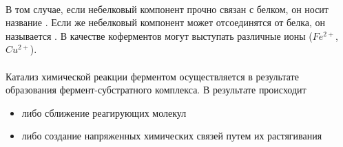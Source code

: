 \paragraph*{}В том случае, если небелковый компонент прочно связан с белком, он носит название . Если же небелковый компонент может отсоединятся от белка, он называется . В качестве коферментов могут выступать различные ионы ($Fe^{2+}$, $Cu^{2+}$). 






\paragraph*{}Катализ химической реакции ферментом осуществляется в результате образования фермент-субстратного комплекса. В результате происходит 

\begin{itemize}

\item либо сближение реагирующих молекул 
\item либо создание напряженных химических связей путем их растягивания

\end{itemize}

